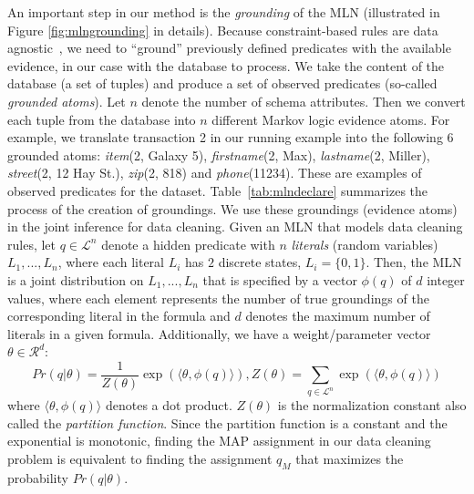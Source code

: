 An important step in our method is the \textit{grounding} of the MLN (illustrated in Figure \ref{fig:mlngrounding} in details). Because constraint-based rules are data agnostic~\cite{fan2012foundations}, we need to ``ground'' previously defined predicates with the available evidence, in our case with the database to process. We take the content of the database (a set of tuples) and produce a set of observed predicates (so-called \textit{grounded atoms}). Let $n$ denote the number of schema attributes. Then we convert each tuple from the database into $n$ different Markov logic evidence atoms. For example, we translate transaction 2 in our running example into the following 6 grounded atoms: \textsl{item}(2, Galaxy 5), \textsl{firstname}(2, Max), \textsl{lastname}(2, Miller), \textsl{street}(2, 12 Hay St.), \textsl{zip}(2, 818) and \textsl{phone}(11234). These are examples of observed predicates for the dataset. Table~\ref{tab:mlndeclare} summarizes the process of the creation of groundings. We use these groundings (evidence atoms) in the joint inference for data cleaning. 
Given an MLN that models data cleaning rules, let $q \in \mathcal{L}^n$ denote a hidden predicate with $n$ \emph{literals} (random variables) $L_1,...,L_n$, where each literal $L_i$ has $2$ discrete states, $L_i = \lbrace 0,1 \rbrace$. Then, the MLN is a joint distribution on  $L_1,...,L_n$ that is specified by a vector $\phi(q)$ of $d$ integer values, where each element represents the number of true groundings of the corresponding literal in the formula and $d$ denotes the maximum number of literals in a given formula. Additionally, we have a weight/parameter vector $\theta \in \mathcal{R}^d$:
\begin{equation*}
Pr \left( q | \theta \right) = 
\frac{1}{Z(\theta)} \exp\left( \langle \theta, \phi(q) \rangle  \right), 
Z(\theta) = \sum_{q \in \mathcal{L}^n}\exp\left( \langle \theta, \phi(q) \rangle  \right) 
\end{equation*}
where $\langle \theta, \phi(q) \rangle$ denotes a dot product. $Z(\theta)$ is the normalization constant also called the \emph{partition function}. Since the partition function is a constant and the exponential is monotonic, finding the MAP assignment in our data cleaning problem is equivalent to finding the assignment $q_M$ that maximizes the probability $Pr \left( q | \theta \right)$.

